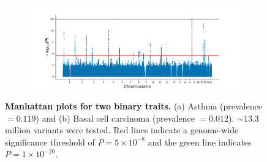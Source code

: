 \begin{figure}[h!]
\begin{subfigure}{.5\textwidth}
    \caption{}
    \end{subfigure}%
    \begin{subfigure}{.5\textwidth}
    \includegraphics[width=\textwidth]{figures/manhattan_bin/qd_Basal_cell_carcinoma.sumstats.gz.png}
    \caption{}
    \end{subfigure}
    \caption{\textbf{Manhattan plots for two binary traits.}
    (a) Asthma (prevalence $= 0.119$) and (b) Basal cell carcinoma (prevalence $= 0.012$).
    ${\sim}13.3$ million variants were tested.
    Red lines indicate a genome-wide significance threshold of $ P = 5 \times 10^{-8}$ and the green line indicates $P = 1 \times 10^{-20}$.
    }
    \label{fig:qd_man_bin1}
\end{figure}

